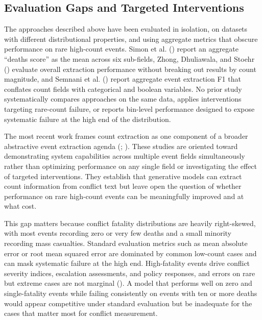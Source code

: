 \documentclass[
  11pt,
]{article}
\begin{document}
\subsection{Evaluation Gaps and Targeted
Interventions}\label{evaluation-gaps-and-targeted-interventions}

The approaches described above have been evaluated in isolation, on
datasets with different distributional properties, and using aggregate
metrics that obscure performance on rare high-count events. Simon et al.
() report an aggregate ``deaths score'' as
the mean across six sub-fields, Zhong, Dhuliawala, and Stoehr
() evaluate overall extraction performance
without breaking out results by count magnitude, and Semnani et al.
() report aggregate event extraction F1
that conflates count fields with categorical and boolean variables. No
prior study systematically compares approaches on the same data, applies
interventions targeting rare-count failure, or reports bin-level
performance designed to expose systematic failure at the high end of the
distribution.

The most recent work frames count extraction as one component of a
broader abstractive event extraction agenda
(;
). These studies are
oriented toward demonstrating system capabilities across multiple event
fields simultaneously rather than optimizing performance on any single
field or investigating the effect of targeted interventions. They
establish that generative models can extract count information from
conflict text but leave open the question of whether performance on rare
high-count events can be meaningfully improved and at what cost.

This gap matters because conflict fatality distributions are heavily
right-skewed, with most events recording zero or very few deaths and a
small minority recording mass casualties. Standard evaluation metrics
such as mean absolute error or root mean squared error are dominated by
common low-count cases and can mask systematic failure at the high end.
High-fatality events drive conflict severity indices, escalation
assessments, and policy responses, and errors on rare but extreme cases
are not marginal (). A model that
performs well on zero and single-fatality events while failing
consistently on events with ten or more deaths would appear competitive
under standard evaluation but be inadequate for the cases that matter
most for conflict measurement.
\end{document}
